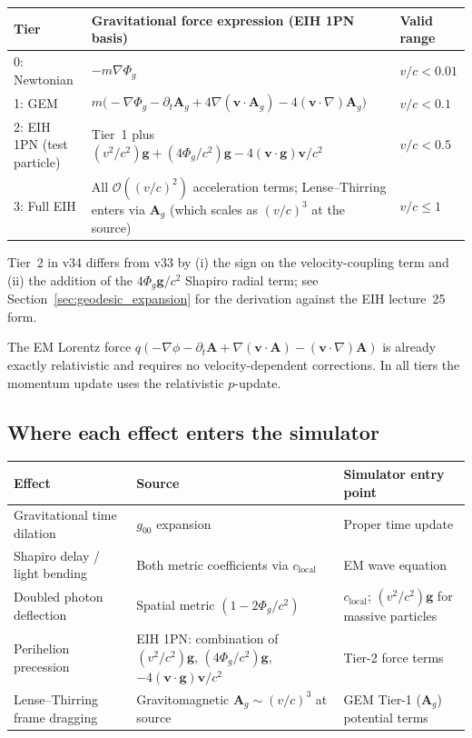 \documentclass[11pt,a4paper]{article}
\newcommand{\vv}[1]{\mathbf{#1}}
\newcommand{\Phig}{\Phi_g}
\newcommand{\Ag}{\vv{A}_g}
\newcommand{\order}[1]{\mathcal{O}(#1)}
\begin{document}
\begin{center}
\begin{tabular}{@{}lL{8cm}L{2cm}@{}}
\toprule
\textbf{Tier} & \textbf{Gravitational force expression (EIH 1PN basis)} & \textbf{Valid range} \\
: Newtonian & $-m\nabla\Phig$ & $v/c < 0.01$ \\
1: GEM       & $m\bigl(-\nabla\Phig - \partial_t\Ag + 4\nabla(\vv{v}\cdot\Ag) - 4(\vv{v}\cdot\nabla)\Ag\bigr)$ & $v/c < 0.1$ \\
2: EIH 1PN (test particle) & Tier~1 plus $(v^2/c^2)\vv{g} + (4\Phig/c^2)\vv{g} - 4(\vv{v}\cdot\vv{g})\vv{v}/c^2$ & $v/c < 0.5$ \\
3: Full EIH  & All $\order{(v/c)^2}$ acceleration terms; Lense--Thirring enters via $\Ag$ (which scales as $(v/c)^3$ at the source) & $v/c \leq 1$ \\
\bottomrule
\end{tabular}
\end{center}

Tier~2 in v34 differs from v33 by (i) the sign on the velocity-coupling
term and (ii) the addition of the $4\Phig\vv{g}/c^2$ Shapiro radial term;
see Section~\ref{sec:geodesic_expansion} for the derivation against the
EIH lecture~25 form.

The EM Lorentz force $q(-\nabla\phi - \partial_t\vv{A} + \nabla(\vv{v}\cdot\vv{A}) - (\vv{v}\cdot\nabla)\vv{A})$ is already exactly relativistic and requires no velocity-dependent corrections.  In all tiers the momentum update uses the relativistic $p$-update.

\subsection{Where each effect enters the simulator}

\begin{center}
\begin{tabular}{@{}L{4.5cm}L{4cm}L{4cm}@{}}
\toprule
\textbf{Effect} & \textbf{Source} & \textbf{Simulator entry point} \\
\midrule
Gravitational time dilation & $g_{00}$ expansion & Proper time update \\
Shapiro delay / light bending & Both metric coefficients via $c_{\mathrm{local}}$ & EM wave equation \\
Doubled photon deflection & Spatial metric $(1-2\Phig/c^2)$ & $c_{\mathrm{local}}$; $(v^2/c^2)\vv{g}$ for massive particles \\
Perihelion precession & EIH 1PN: combination of $(v^2/c^2)\vv{g}$, $(4\Phig/c^2)\vv{g}$, $-4(\vv{v}\cdot\vv{g})\vv{v}/c^2$ & Tier-2 force terms \\
Lense--Thirring frame dragging & Gravitomagnetic $\Ag\sim(v/c)^3$ at source & GEM Tier-1 ($\Ag$) potential terms \\
\bottomrule
\end{tabular}
\end{center}
\end{document}

